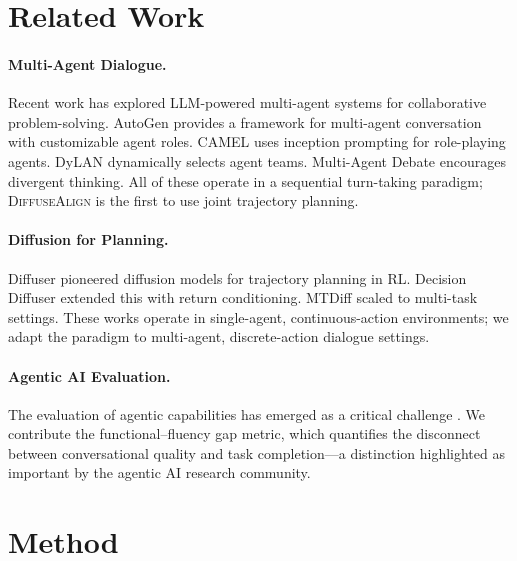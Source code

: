 \documentclass[11pt]{article}
\newcommand{\method}{\textsc{DiffuseAlign}}
\begin{document}

\section{Related Work}
\label{sec:related}

\paragraph{Multi-Agent Dialogue.} Recent work has explored LLM-powered multi-agent systems for collaborative problem-solving. AutoGen \citep{autogen} provides a framework for multi-agent conversation with customizable agent roles. CAMEL \citep{camel} uses inception prompting for role-playing agents. DyLAN \citep{dylan} dynamically selects agent teams. Multi-Agent Debate \citep{mad} encourages divergent thinking. All of these operate in a sequential turn-taking paradigm; \method{} is the first to use joint trajectory planning.

\paragraph{Diffusion for Planning.} Diffuser \citep{diffuser} pioneered diffusion models for trajectory planning in RL. Decision Diffuser \citep{decision_diffuser} extended this with return conditioning. MTDiff \citep{mtdiff} scaled to multi-task settings. These works operate in single-agent, continuous-action environments; we adapt the paradigm to multi-agent, discrete-action dialogue settings.

\paragraph{Agentic AI Evaluation.} The evaluation of agentic capabilities has emerged as a critical challenge \citep{agentbench,webagents}. We contribute the functional--fluency gap metric, which quantifies the disconnect between conversational quality and task completion---a distinction highlighted as important by the agentic AI research community.


\section{Method}
\label{sec:method}
\end{document}

